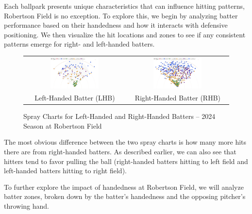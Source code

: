 \documentclass{article}
\begin{document}
Each ballpark presents unique characteristics that can influence hitting patterns, Robertson Field is no exception. To explore this, we begin by analyzing batter performance based on their handedness and how it interacts with defensive positioning. We then visualize the hit locations and zones to see if any consistent patterns emerge for right- and left-handed batters.
\vspace{0.5cm} 
\begin{figure}[h]
    \centering
    \begin{tabular}{cc}  
        \includegraphics[width=0.5\textwidth]{images/LHB2024_spray_Robertson.png} & 
        \includegraphics[width=0.5\textwidth]{images/RHB2024_spray_Robertson.png} \\
         Left-Handed Batter (LHB) & Right-Handed Batter (RHB)
    \end{tabular}
    \caption{Spray Charts for Left-Handed and Right-Handed Batters – 2024 Season at Robertson Field}
    \label{fig:spray_charts_batter_handedness}
    \cite{trackman2024} \cite{columbialions2024baseball}
\end{figure}
\vspace{.5cm}

The most obvious difference between the two spray charts is how many more hits there are from right-handed batters. As described earlier, we can also see that hitters tend to favor pulling the ball (right-handed batters hitting to left field and left-handed batters hitting to right field). 

To further explore the impact of handedness at Robertson Field, we will analyze batter zones, broken down by the batter's handedness and the opposing pitcher's throwing hand.
\end{document}
